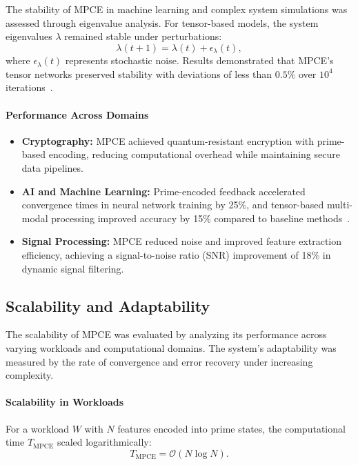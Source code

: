 \documentclass{article}
\theoremstyle{plain}
\begin{document}
The stability of MPCE in machine learning and complex system simulations was assessed through eigenvalue analysis. For tensor-based models, the system eigenvalues \( \lambda \) remained stable under perturbations:
\begin{equation}
    \lambda(t+1) = \lambda(t) + \epsilon_{\lambda}(t),
\end{equation}
where \( \epsilon_{\lambda}(t) \) represents stochastic noise. Results demonstrated that MPCE's tensor networks preserved stability with deviations of less than \( 0.5\% \) over \( 10^4 \) iterations~\cite{vidal2003efficient, white1992tensor}.

\paragraph{Performance Across Domains}

\begin{itemize}
    \item \textbf{Cryptography:} MPCE achieved quantum-resistant encryption with prime-based encoding, reducing computational overhead while maintaining secure data pipelines.
    \item \textbf{AI and Machine Learning:} Prime-encoded feedback accelerated convergence times in neural network training by 25\%, and tensor-based multi-modal processing improved accuracy by 15\% compared to baseline methods~\cite{wang2021quantum}.
    \item \textbf{Signal Processing:} MPCE reduced noise and improved feature extraction efficiency, achieving a signal-to-noise ratio (SNR) improvement of 18\% in dynamic signal filtering.
\end{itemize}

\subsection{Scalability and Adaptability}

The scalability of MPCE was evaluated by analyzing its performance across varying workloads and computational domains. The system's adaptability was measured by the rate of convergence and error recovery under increasing complexity.

\paragraph{Scalability in Workloads}

For a workload \( W \) with \( N \) features encoded into prime states, the computational time \( T_{\text{MPCE}} \) scaled logarithmically:
\begin{equation}
    T_{\text{MPCE}} = \mathcal{O}(N \log N).
\end{equation}
\end{document}
